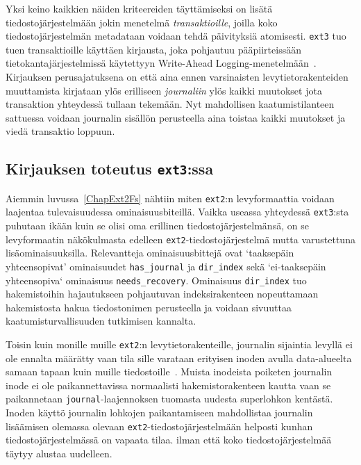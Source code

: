 Yksi keino kaikkien näiden kriteereiden täyttämiseksi on lisätä tiedostojärjestelmään jokin menetelmä \emph{transaktioille}, joilla koko tiedostojärjestelmän metadataan voidaan tehdä päivityksiä atomisesti.
\texttt{ext3} tuo tuen transaktioille käyttäen kirjausta, joka pohjautuu pääpiirteissään tietokantajärjestelmissä käytettyyn Write-Ahead Logging-menetelmään~\cite{AriesWal}.
Kirjauksen perusajatuksena on että aina ennen varsinaisten levytietorakenteiden muuttamista kirjataan ylös erilliseen \emph{journaliin} ylös kaikki muutokset jota transaktion yhteydessä tullaan tekemään.
Nyt mahdollisen kaatumistilanteen sattuessa voidaan journalin sisällön perusteella aina toistaa kaikki muutokset ja viedä transaktio loppuun.

%

\subsection{Kirjauksen toteutus \texttt{ext3}:ssa}
Aiemmin luvussa~\ref{ChapExt2Fs} nähtiin miten \texttt{ext2}:n levyformaattia voidaan laajentaa tulevaisuudessa ominaisuusbiteillä.
Vaikka useassa yhteydessä \texttt{ext3}:sta puhutaan ikään kuin se olisi oma erillinen tiedostojärjestelmänsä,
on se levyformaatin näkökulmasta edelleen \texttt{ext2}-tiedostojärjestelmä mutta varustettuna lisäominaisuuksilla.
Relevantteja ominaisuusbittejä ovat `taaksepäin yhteensopivat' ominaisuudet \texttt{has\_journal} ja \texttt{dir\_index} sekä `ei-taaksepäin yhteensopiva` ominaisuus \texttt{needs\_recovery}.
Ominaisuus \texttt{dir\_index} tuo hakemistoihin hajautukseen pohjautuvan indeksirakenteen nopeuttamaan hakemistosta hakua tiedostonimen perusteella ja voidaan sivuuttaa kaatumisturvallisuuden tutkimisen kannalta.

Toisin kuin monille muille \texttt{ext2}:n levytietorakenteille, journalin sijaintia levyllä ei ole ennalta määrätty vaan tila sille varataan erityisen inoden avulla data-alueelta samaan tapaan kuin muille tiedostoille~\cite{Ext2Journal}.
Muista inodeista poiketen journalin inode ei ole paikannettavissa normaalisti hakemistorakenteen kautta vaan se paikannetaan \texttt{journal}-laajennoksen tuomasta uudesta superlohkon kentästä.
Inoden käyttö journalin lohkojen paikantamiseen mahdollistaa journalin lisäämisen olemassa olevaan \texttt{ext2}-tiedostojärjestelmään helposti kunhan tiedostojärjestelmässä on vapaata tilaa.
ilman että koko tiedostojärjestelmää täytyy alustaa uudelleen.

